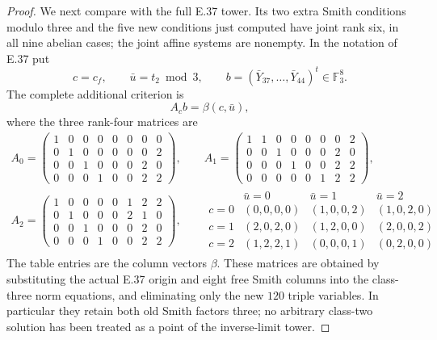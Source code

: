 \begin{proof}
We next compare with the full E.37 tower.
Its two extra Smith conditions modulo three
and the five new conditions just computed have
joint rank six, in all nine abelian cases;
the joint affine systems are nonempty.
In the notation of E.37 put
\[
 c=c_f,\qquad \bar u=t_2\bmod3,\qquad
 b=(\bar Y_{37},\ldots,\bar Y_{44})^t\in\mathbb F_3^8.
 \tag{E.44.12}
\]
The complete additional criterion is
\[
                         A_c b=\beta(c,\bar u),
 \tag{E.44.13}
\]
where the three rank-four matrices are
\[
 \begin{gathered}
 A_0=\begin{pmatrix}
 1&0&0&0&0&0&0&0\\
 0&1&0&0&0&0&0&2\\
 0&0&1&0&0&0&2&0\\
 0&0&0&1&0&0&2&2
 \end{pmatrix},\qquad
 A_1=\begin{pmatrix}
 1&1&0&0&0&0&0&2\\
 0&0&1&0&0&0&2&0\\
 0&0&0&1&0&0&2&2\\
 0&0&0&0&0&1&2&2
 \end{pmatrix},\\[2mm]
 A_2=\begin{pmatrix}
 1&0&0&0&0&1&2&2\\
 0&1&0&0&0&2&1&0\\
 0&0&1&0&0&0&2&0\\
 0&0&0&1&0&0&2&2
 \end{pmatrix},\qquad
 \begin{array}{c|ccc}
 &\bar u=0&\bar u=1&\bar u=2\\ \hline
 c=0&(0,0,0,0)&(1,0,0,2)&(1,0,2,0)\\
 c=1&(2,0,2,0)&(1,2,0,0)&(2,0,0,2)\\
 c=2&(1,2,2,1)&(0,0,0,1)&(0,2,0,0)
 \end{array}
 \end{gathered}
 \tag{E.44.14}
\]
The table entries are the column vectors $\beta$.
These matrices are obtained by substituting the
actual E.37 origin and eight free Smith columns
into the class-three norm equations, and eliminating
only the new $120$ triple variables.
In particular they retain both old Smith factors
three; no arbitrary class-two solution has been
treated as a point of the inverse-limit tower.


\end{proof}
